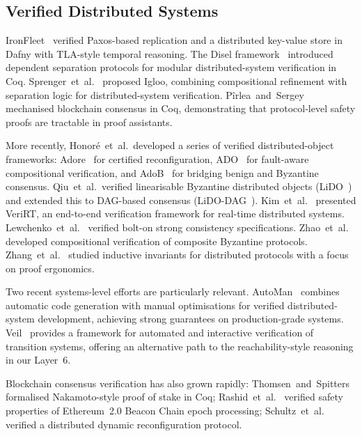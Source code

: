 \documentclass[sigconf,10pt]{acmart}
\begin{document}
\subsection{Verified Distributed Systems}

IronFleet~\cite{ironfleet} verified Paxos-based replication and a
distributed key-value store in Dafny with TLA-style temporal
reasoning.  The Disel framework~\cite{sergey2018disel} introduced
dependent separation protocols for modular distributed-system
verification in Coq.  Sprenger~et~al.~\cite{sprenger2020igloo}
proposed Igloo, combining compositional refinement with separation
logic for distributed-system verification.
P\^irlea~and~Sergey~\cite{pirlea2018blockchain} mechanised blockchain
consensus in Coq, demonstrating that protocol-level safety proofs
are tractable in proof assistants.

More recently, Honor\'e~et~al.\ developed a series of verified
distributed-object frameworks: Adore~\cite{honore2022adore} for
certified reconfiguration, ADO~\cite{honore2021ado} for
fault-aware compositional verification, and
AdoB~\cite{honore2024adob} for bridging benign and Byzantine
consensus.  Qiu~et~al.\ verified linearisable Byzantine distributed
objects (LiDO~\cite{qiu2024lido}) and extended this to DAG-based
consensus (LiDO-DAG~\cite{qiu2025lidodag}).
Kim~et~al.~\cite{kim2025verirt} presented VeriRT, an end-to-end
verification framework for real-time distributed systems.
Lewchenko~et~al.~\cite{lewchenko2025bolton} verified bolt-on strong
consistency specifications.
Zhao~et~al.~\cite{zhao2024byzantine} developed compositional
verification of composite Byzantine protocols.
Zhang~et~al.~\cite{zhang2024invariants} studied inductive invariants
for distributed protocols with a focus on proof ergonomics.

Two recent systems-level efforts are particularly relevant.
AutoMan~\cite{zhang2025automan} combines automatic code generation
with manual optimisations for verified distributed-system development,
achieving strong guarantees on production-grade systems.
Veil~\cite{pirlea2025veil} provides a framework for automated and
interactive verification of transition systems, offering an
alternative path to the reachability-style reasoning in our Layer~6.

Blockchain consensus verification has also grown rapidly:
Thomsen~and~Spitters~\cite{thomsen2021nakamoto} formalised
Nakamoto-style proof of stake in Coq;
Rashid~et~al.~\cite{rashid2025beacon} verified safety properties of
Ethereum~2.0 Beacon Chain epoch processing;
Schultz~et~al.~\cite{schultz2022reconfig} verified a distributed
dynamic reconfiguration protocol.
\end{document}
